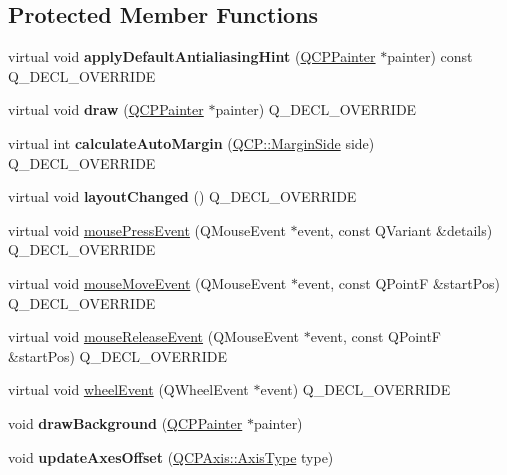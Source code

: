 \subsection*{Protected Member Functions}
\begin{DoxyCompactItemize}
\item 
\mbox{\label{class_q_c_p_axis_rect_a4a318008e2b7f881a14c3d97186b31f9}} 
virtual void {\bfseries apply\+Default\+Antialiasing\+Hint} (\mbox{\hyperlink{class_q_c_p_painter}{Q\+C\+P\+Painter}} $\ast$painter) const Q\+\_\+\+D\+E\+C\+L\+\_\+\+O\+V\+E\+R\+R\+I\+DE
\item 
\mbox{\label{class_q_c_p_axis_rect_af710c50530e370539a4439d6c4db9090}} 
virtual void {\bfseries draw} (\mbox{\hyperlink{class_q_c_p_painter}{Q\+C\+P\+Painter}} $\ast$painter) Q\+\_\+\+D\+E\+C\+L\+\_\+\+O\+V\+E\+R\+R\+I\+DE
\item 
\mbox{\label{class_q_c_p_axis_rect_ac51055d83f5f414b6d013d3a24b0a941}} 
virtual int {\bfseries calculate\+Auto\+Margin} (\mbox{\hyperlink{namespace_q_c_p_a7e487e3e2ccb62ab7771065bab7cae54}{Q\+C\+P\+::\+Margin\+Side}} side) Q\+\_\+\+D\+E\+C\+L\+\_\+\+O\+V\+E\+R\+R\+I\+DE
\item 
\mbox{\label{class_q_c_p_axis_rect_a575e38ac71a21906dc2d7b3364db2d62}} 
virtual void {\bfseries layout\+Changed} () Q\+\_\+\+D\+E\+C\+L\+\_\+\+O\+V\+E\+R\+R\+I\+DE
\item 
virtual void \mbox{\hyperlink{class_q_c_p_axis_rect_aa9a7c807eaa4666870ac94aa6abc4dde}{mouse\+Press\+Event}} (Q\+Mouse\+Event $\ast$event, const Q\+Variant \&details) Q\+\_\+\+D\+E\+C\+L\+\_\+\+O\+V\+E\+R\+R\+I\+DE
\item 
virtual void \mbox{\hyperlink{class_q_c_p_axis_rect_a9cd27ad8c5cfb49aefd9dbb30def4beb}{mouse\+Move\+Event}} (Q\+Mouse\+Event $\ast$event, const Q\+PointF \&start\+Pos) Q\+\_\+\+D\+E\+C\+L\+\_\+\+O\+V\+E\+R\+R\+I\+DE
\item 
virtual void \mbox{\hyperlink{class_q_c_p_axis_rect_a6c89b988d3a0b93c0878f0ebdb5037f4}{mouse\+Release\+Event}} (Q\+Mouse\+Event $\ast$event, const Q\+PointF \&start\+Pos) Q\+\_\+\+D\+E\+C\+L\+\_\+\+O\+V\+E\+R\+R\+I\+DE
\item 
virtual void \mbox{\hyperlink{class_q_c_p_axis_rect_a93eeaa0c127d6d6fe8171b2455080262}{wheel\+Event}} (Q\+Wheel\+Event $\ast$event) Q\+\_\+\+D\+E\+C\+L\+\_\+\+O\+V\+E\+R\+R\+I\+DE
\item 
\mbox{\label{class_q_c_p_axis_rect_ab49d338d1ce74b476fcead5b32cf06dc}} 
void {\bfseries draw\+Background} (\mbox{\hyperlink{class_q_c_p_painter}{Q\+C\+P\+Painter}} $\ast$painter)
\item 
\mbox{\label{class_q_c_p_axis_rect_a6024ccdc74f5dc0e8a0fe482e5b28a20}} 
void {\bfseries update\+Axes\+Offset} (\mbox{\hyperlink{class_q_c_p_axis_ae2bcc1728b382f10f064612b368bc18a}{Q\+C\+P\+Axis\+::\+Axis\+Type}} type)
\end{DoxyCompactItemize}
